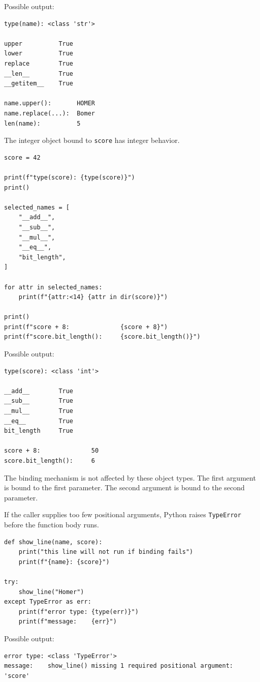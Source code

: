 Possible output:

\begin{verbatim}
type(name): <class 'str'>

upper          True
lower          True
replace        True
__len__        True
__getitem__    True

name.upper():       HOMER
name.replace(...):  Bomer
len(name):          5
\end{verbatim}

The integer object bound to \texttt{score} has integer behavior.

\begin{verbatim}
score = 42

print(f"type(score): {type(score)}")
print()

selected_names = [
    "__add__",
    "__sub__",
    "__mul__",
    "__eq__",
    "bit_length",
]

for attr in selected_names:
    print(f"{attr:<14} {attr in dir(score)}")

print()
print(f"score + 8:              {score + 8}")
print(f"score.bit_length():     {score.bit_length()}")
\end{verbatim}

Possible output:

\begin{verbatim}
type(score): <class 'int'>

__add__        True
__sub__        True
__mul__        True
__eq__         True
bit_length     True

score + 8:              50
score.bit_length():     6
\end{verbatim}

The binding mechanism is not affected by these object types. The first argument is bound to the first parameter. The second argument is bound to the second parameter.

If the caller supplies too few positional arguments, Python raises \texttt{TypeError} before the function body runs.

\begin{verbatim}
def show_line(name, score):
    print("this line will not run if binding fails")
    print(f"{name}: {score}")

try:
    show_line("Homer")
except TypeError as err:
    print(f"error type: {type(err)}")
    print(f"message:    {err}")
\end{verbatim}

Possible output:

\begin{verbatim}
error type: <class 'TypeError'>
message:    show_line() missing 1 required positional argument: 'score'
\end{verbatim}


